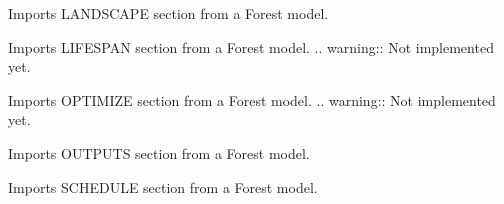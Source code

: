 \documentclass[letterpaper,10pt,english]{sphinxmanual}
\begin{document}
\begin{fulllineitems}
\begin{fulllineitems}
\end{fulllineitems}


\begin{fulllineitems}
\label{\detokenize{forest:forest.ForestModel.import_landscape_section}}
Imports LANDSCAPE section from a Forest model.

\end{fulllineitems}


\begin{fulllineitems}
\label{\detokenize{forest:forest.ForestModel.import_lifespan_section}}
Imports LIFESPAN section from a Forest model.
.. warning:: Not implemented yet.

\end{fulllineitems}


\begin{fulllineitems}
\label{\detokenize{forest:forest.ForestModel.import_optimize_section}}
Imports OPTIMIZE section from a Forest model.
.. warning:: Not implemented yet.

\end{fulllineitems}


\begin{fulllineitems}
\label{\detokenize{forest:forest.ForestModel.import_outputs_section}}
Imports OUTPUTS section from a Forest model.

\end{fulllineitems}


\begin{fulllineitems}
\label{\detokenize{forest:forest.ForestModel.import_schedule_section}}
Imports SCHEDULE section from a Forest model.


\end{fulllineitems}
\end{fulllineitems}
\end{document}
